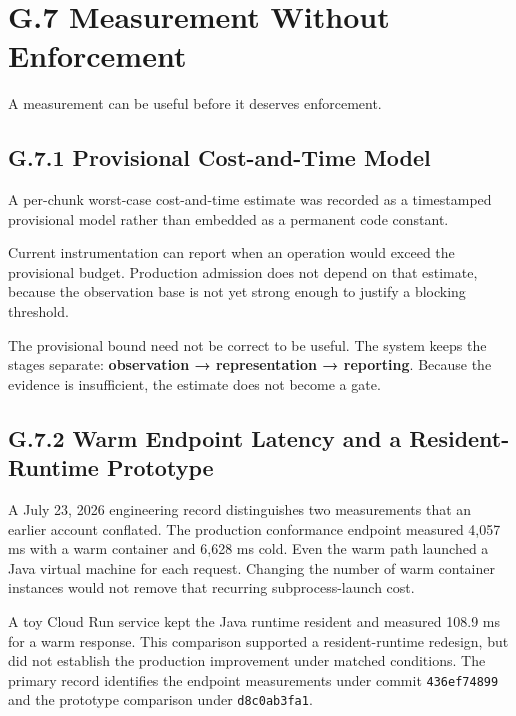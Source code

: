 \section{G.7 Measurement Without Enforcement}\label{heading:measurement-seed}

A measurement can be useful before it deserves enforcement.

\subsection{G.7.1 Provisional Cost-and-Time Model}\label{heading:g.7.1-provisional-cost-and-time-model}

A per-chunk worst-case cost-and-time estimate was recorded as a timestamped provisional model rather than embedded as a permanent code constant.

Current instrumentation can report when an operation would exceed the provisional budget. Production admission does not depend on that estimate, because the observation base is not yet strong enough to justify a blocking threshold.

The provisional bound need not be correct to be useful. The system keeps the stages separate: \textbf{observation → representation → reporting}. Because the evidence is insufficient, the estimate does not become a gate.


\subsection{G.7.2 Warm Endpoint Latency and a Resident-Runtime Prototype}\label{heading:g.7.2-warm-endpoint-latency-and-a-resident-runtime-prototype}

A July 23, 2026 engineering record distinguishes two measurements that an earlier account conflated. The production conformance endpoint measured 4,057 ms with a warm container and 6,628 ms cold. Even the warm path launched a Java virtual machine for each request. Changing the number of warm container instances would not remove that recurring subprocess-launch cost.

A toy Cloud Run service kept the Java runtime resident and measured 108.9 ms for a warm response. This comparison supported a resident-runtime redesign, but did not establish the production improvement under matched conditions. The primary record identifies the endpoint measurements under commit \texttt{436ef74899} and the prototype comparison under \texttt{d8c0ab3fa1}.

